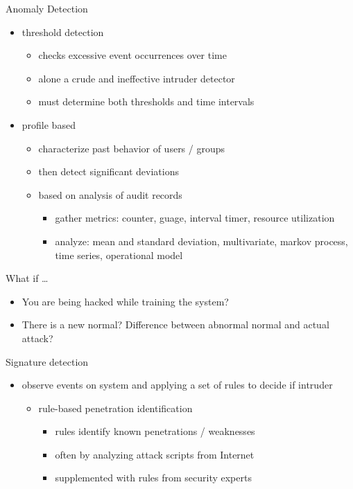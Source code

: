 \documentclass{beamer}
\begin{document}
\begin{frame}{Anomaly Detection}
  \begin{itemize}
  \item threshold detection 
    \begin{itemize}
    \item checks excessive event occurrences over time 
    \item alone a crude and ineffective intruder detector 
    \item must determine both thresholds and time intervals 
    \end{itemize}
  \item profile based 
    \begin{itemize}
    \item characterize past behavior of users / groups 
    \item then detect significant deviations 
    \item based on analysis of audit records 
      \begin{itemize}
      \item gather metrics: counter, guage, interval timer, resource utilization
      \item analyze: mean and standard deviation, multivariate, markov 
        process, time series, operational model 
      \end{itemize}
    \end{itemize}
  \end{itemize}
\end{frame}


\begin{frame}{What if \dots}
  \begin{itemize}
  \item You are being hacked while training the 
    system? 
  \item There is a new normal? Difference between 
    abnormal normal and actual attack?
  \end{itemize}
\end{frame}

\begin{frame}{Signature detection}
  \begin{itemize}
  \item observe events on system and applying a set of 
    rules to decide if intruder 
    \begin{itemize}
    \item rule-based penetration identification 
      \begin{itemize}
      \item rules identify known penetrations / weaknesses 
      \item often by analyzing attack scripts from Internet 
      \item supplemented with rules from security experts 
      \end{itemize}
    \end{itemize}
  \end{itemize}
\end{frame}
\end{document}

